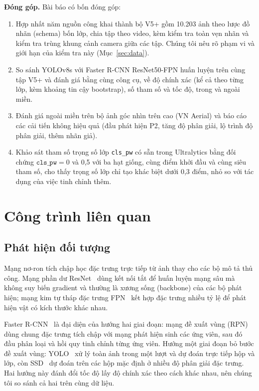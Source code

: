 \documentclass[10pt,journal,a4paper]{IEEEtran}
\newcommand{\clspw}{\texttt{cls\_pw}}
\begin{document}
\textbf{Đóng góp.} Bài báo có bốn đóng góp:
\begin{enumerate}
\item Hợp nhất năm nguồn công khai thành bộ V5+ gồm 10.203 ảnh theo lược đồ nhãn (schema) bốn lớp, chia tập theo video, kèm kiểm tra toàn vẹn nhãn và kiểm tra trùng khung cảnh camera giữa các tập. Chúng tôi nêu rõ phạm vi và giới hạn của kiểm tra này (Mục~\ref{sec:data}).
\item So sánh YOLOv8s với Faster R-CNN ResNet50-FPN huấn luyện trên cùng tập V5+ và đánh giá bằng cùng công cụ, về độ chính xác (kể cả theo từng lớp, kèm khoảng tin cậy bootstrap), số tham số và tốc độ, trong và ngoài miền.
\item Đánh giá ngoài miền trên bộ ảnh góc nhìn trên cao (VN Aerial) và báo cáo các cải tiến không hiệu quả (đầu phát hiện P2, tăng độ phân giải, lộ trình độ phân giải, thêm nhãn giả).
\item Khảo sát tham số trọng số lớp \clspw{} có sẵn trong Ultralytics bằng đối chứng $\clspw = 0$ và 0,5 với ba hạt giống, cùng điểm khởi đầu và cùng siêu tham số, cho thấy trọng số lớp chỉ tạo khác biệt dưới 0,3 điểm, nhỏ so với tác dụng của việc tinh chỉnh thêm.
\end{enumerate}

\section{Công trình liên quan}
\subsection{Phát hiện đối tượng}
Mạng nơ-ron tích chập học đặc trưng trực tiếp từ ảnh thay cho các bộ mô tả thủ công. Mạng phần dư ResNet~\cite{resnet} dùng kết nối tắt để huấn luyện mạng sâu mà không suy biến gradient và thường là xương sống (backbone) của các bộ phát hiện; mạng kim tự tháp đặc trưng FPN~\cite{fpn} kết hợp đặc trưng nhiều tỷ lệ để phát hiện vật có kích thước khác nhau.

Faster R-CNN~\cite{frcnn} là đại diện của hướng hai giai đoạn: mạng đề xuất vùng (RPN) dùng chung đặc trưng tích chập với mạng phát hiện sinh các ứng viên, sau đó đầu phân loại và hồi quy tinh chỉnh từng ứng viên. Hướng một giai đoạn bỏ bước đề xuất vùng: YOLO~\cite{yolo} xử lý toàn ảnh trong một lượt và dự đoán trực tiếp hộp và lớp, còn SSD~\cite{ssd} dự đoán trên các hộp mặc định ở nhiều độ phân giải đặc trưng. Hai hướng này đánh đổi tốc độ lấy độ chính xác theo cách khác nhau, nên chúng tôi so sánh cả hai trên cùng dữ liệu.
\end{document}
